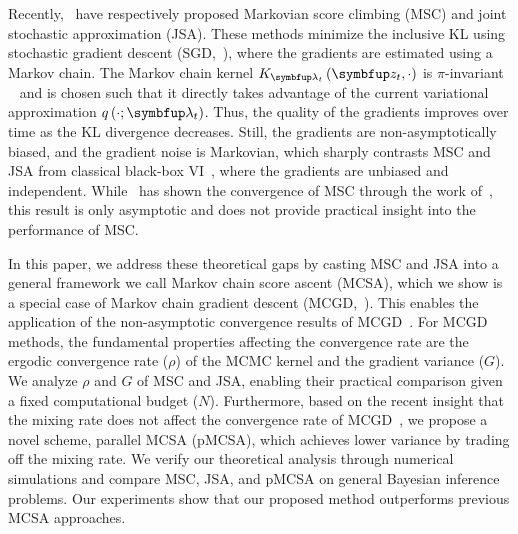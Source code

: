 Recently,~\citet{NEURIPS2020_b2070693,pmlr-v124-ou20a} have respectively proposed Markovian score climbing (MSC) and joint stochastic approximation (JSA).
These methods minimize the inclusive KL using stochastic gradient descent (SGD,~\citealt{robbins_stochastic_1951}), where the gradients are estimated using a Markov chain.
The Markov chain kernel \(K_{\vlambda_t}\left(\vz_t, \cdot\right)\) is \(\pi\)-invariant ~\citep{robert_monte_2004} and is chosen such that it directly takes advantage of the current variational approximation \(q\left(\cdot; \vlambda_t\right)\).
Thus, the quality of the gradients improves over time as the KL divergence decreases.
Still, the gradients are non-asymptotically biased, and the gradient noise is Markovian, which sharply contrasts MSC and JSA from classical black-box VI~\citep{pmlr-v33-ranganath14, JMLR:v18:16-107}, where the gradients are unbiased and independent.
While~\citet{NEURIPS2020_b2070693} has shown the convergence of MSC through the work of~\citet{gu_stochastic_1998}, this result is only asymptotic and does not provide practical insight into the performance of MSC.

%

In this paper, we address these theoretical gaps by casting MSC and JSA into a general framework we call Markov chain score ascent (MCSA), which we show is a special case of Markov chain gradient descent (MCGD,~\citealt{duchi_ergodic_2012}).
This enables the application of the non-asymptotic convergence results of MCGD~\citep{duchi_ergodic_2012, NEURIPS2018_1371bcce, pmlr-v99-karimi19a, doan_finitetime_2020, doan_convergence_2020, Xiong_Xu_Liang_Zhang_2021, debavelaere_convergence_2021}.
For MCGD methods, the fundamental properties affecting the convergence rate are the ergodic convergence rate (\(\rho\)) of the MCMC kernel and the gradient variance (\(G\)).
We analyze \(\rho\) and \(G\) of MSC and JSA, enabling their practical comparison given a fixed computational budget (\(N\)).
Furthermore, based on the recent insight that the mixing rate does not affect the convergence rate of MCGD~\citet{doan_convergence_2020,doan_finitetime_2020}, we propose a novel scheme, parallel MCSA (pMCSA), which achieves lower variance by trading off the mixing rate.
We verify our theoretical analysis through numerical simulations and compare MSC, JSA, and pMCSA on general Bayesian inference problems.
Our experiments show that our proposed method outperforms previous MCSA approaches.

